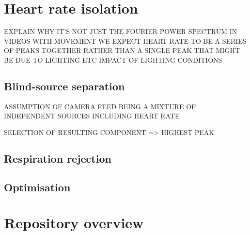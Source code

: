 
\section{Heart rate isolation}
EXPLAIN WHY IT'S NOT JUST THE FOURIER POWER SPECTRUM
IN VIDEOS WITH MOVEMENT WE EXPECT HEART RATE TO BE A SERIES OF PEAKS TOGETHER RATHER THAN A SINGLE PEAK
THAT MIGHT BE DUE TO LIGHTING ETC
IMPACT OF LIGHTING CONDITIONS

\subsection{Blind-source separation}
ASSUMPTION OF CAMERA FEED BEING A MIXTURE OF INDEPENDENT SOURCES INCLUDING HEART RATE

SELECTION OF RESULTING COMPONENT => HIGHEST PEAK



\subsection{Respiration rejection}

\subsection{Optimisation}

\section{Repository overview}
